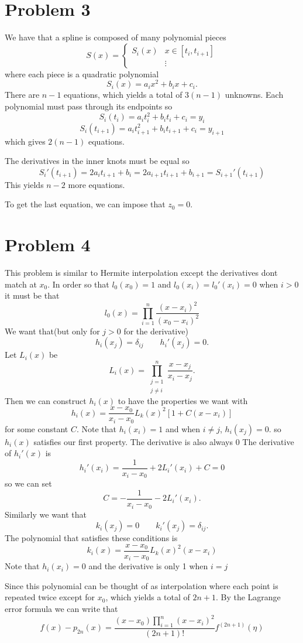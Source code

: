 \documentclass{article}
\begin{document}
\section*{Problem 3}
We have that a spline is composed of many polynomial pieces
\[
	S(x) = 
	\begin{cases}
		S_i(x) & x \in [t_i, t_{i+1}] \\
		&\vdots
	\end{cases}
\]
where each piece is a quadratic polynomial 
\[
	S_i(x) = a_ix^2 + b_ix + c_i.
\]
There are $n-1$ equations, which yields a total of $3(n-1)$ unknowns.
Each polynomial must pass through its endpoints so
\[
	S_i(t_i) = a_it_i^2 + b_it_i + c_i = y_i
\]
\[
	S_i(t_{i+1}) = a_it_{i+1}^2 + b_it_{i+1} + c_i = y_{i+1}
\]
which gives $2(n-1)$ equations.

The derivatives in the inner knots must be equal so 
\[
	S_i'(t_{i+1}) = 2a_it_{i+1} + b_i = 2a_{i+1}t_{i+1} + b_{i+1} = S_{i+1}'(t_{i+1})
\]
This yields $n-2$ more equations.

To get the last equation, we can impose that $z_0 = 0$.
\newpage 

\section*{Problem 4}
This problem is similar to Hermite interpolation except the derivatives dont match at $x_0$.
In order so that $l_0(x_0) = 1$ and $l_0(x_i) = l_0'(x_i) = 0$ when $i>0$ it must be that
\[
	l_0(x) = \prod_{i=1}^n \frac{(x-x_i)^2}{(x_0-x_i)^2}
\]
We want that(but only for $j>0$ for the derivative)
\[
	h_i(x_j) = \delta_{ij} \quad \quad h_i'(x_j) = 0.
\]
Let $L_i(x)$ be 
\[
	L_i(x) = \prod_{\substack{j=1 \\ j \neq i}}^n \frac{x-x_j}{x_i-x_j}.
\]
Then we can construct $h_i(x)$ to have the properties we want with
\[
	h_i(x) = \frac{x-x_0}{x_i-x_0}L_k(x)^2[1+C(x-x_i)]
\]
for some constant $C$.
Note that $h_i(x_i) = 1$ and when $i\neq j$, $h_i(x_j) = 0$.
so $h_i(x)$ satisfies our first property.
The derivative is also always $0$
The derivative of $h_i'(x)$ is 
\[
	h_i'(x_i) = \frac{1}{x_i - x_0} + 2L_i'(x_i) +  C =0
\]
so we can set 
\[
	C = -\frac{1}{x_i - x_0} - 2L_i'(x_i).
\]
Similarly we want that 
\[
	k_i(x_j) = 0 \quad \quad k_i'(x_j) = \delta_{ij}.
\]
The polynomial that satisfies these conditions is 
\[
	k_i(x) = \frac{x-x_0}{x_i-x_0}L_k(x)^2(x-x_i)
\]
Note that $h_i(x_i) = 0$ and the derivative is only 1 when $i=j$

Since this polynomial can be thought of as 
interpolation where each point is repeated twice
except for $x_0$, which yields a total of $2n+1$.
By the Lagrange error formula we can write that 
\[
	f(x) - p_{2n}(x) = \frac{(x-x_0)\prod_{i=1}^n (x-x_i)^2}{(2n+1)!}f^{(2n+1)}(\eta)
\]
\newpage 
\end{document}
